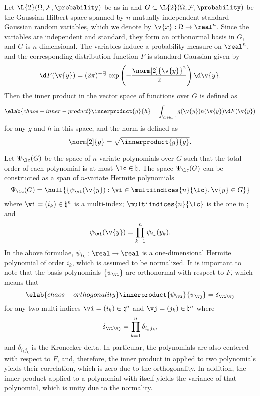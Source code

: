 Let $\L{2}(\Omega, \mathcal{F}, \probability)$ be as in
 and $G \subset \L{2}(\Omega, \mathcal{F},
\probability)$ be the Gaussian Hilbert space \cite{janson1997} spanned by $n$
mutually independent standard Gaussian random variables, which we denote by
$\v{x}: \Omega \to \real^n$. Since the variables are independent and standard,
they form an orthonormal basis in $G$, and $G$ is $n$-dimensional. The variables
induce a probability measure on $\real^n$, and the corresponding distribution
function $F$ is standard Gaussian given by
\[
  \d F(\v{y}) = (2 \pi)^{-\frac{n}{2}} \exp\left(-\frac{\norm[2]{\v{y}}^2}{2}\right) \d \v{y}.
\]
Then the inner product in the vector space of functions over $G$ is defined as
\begin{equation} \elab{chaos-inner-product}
  \innerproduct{g}{h} = \int_{\real^n} g(\v{y}) h(\v{y}) \d F(\v{y})
\end{equation}
for any $g$ and $h$ in this space, and the norm is defined as
\[
  \norm[2]{g} = \sqrt{\innerproduct{g}{g}}.
\]

Let $\Psi_\lc(G)$ be the space of $n$-variate polynomials over $G$ such that the
total order of each polynomial is at most $\lc \in \natural$. The space
$\Psi_\lc(G)$ can be constructed as a span of $n$-variate Hermite polynomials
\cite{eldred2008, maitre2010}
\[
  \Psi_\lc(G) = \hull{\left\{ \psi_{\vi}(\v{y}): \vi \in \multiindices{n}{\lc}, \v{y} \in G \right\}}
\]
where $\vi = (i_k) \in \natural^n$ is a multi-index; $\multiindices{n}{\lc}$ is
the one in ; and
\[
  \psi_{\vi}(\v{y}) = \prod_{k = 1}^n \psi_{i_k}(y_k).
\]
In the above formulae, $\psi_{i_k}: \real \to \real$ is a one-dimensional
Hermite polynomial of order $i_k$, which is assumed to be normalized. It is
important to note that the basis polynomials $\{ \psi_{\vi} \}$ are orthonormal
with respect to $F$, which means that
\begin{equation} \elab{chaos-orthogonality}
  \innerproduct{\psi_{\vi}}{\psi_{\vj}} = \delta_{\vi \vj}
\end{equation}
for any two multi-indices $\vi = (i_k) \in \natural^n$ and $\vj = (j_k) \in
\natural^n$ where
\[
  \delta_{\vi \vj} = \prod_{k = 1}^n \delta_{i_k j_k},
\]
and $\delta_{i_k j_k}$ is the Kronecker delta. In particular, the polynomials
are also centered with respect to $F$, and, therefore, the inner product in
 applied to two polynomials yields their correlation,
which is zero due to the orthogonality. In addition, the inner product applied
to a polynomial with itself yields the variance of that polynomial, which is
unity due to the normality.

